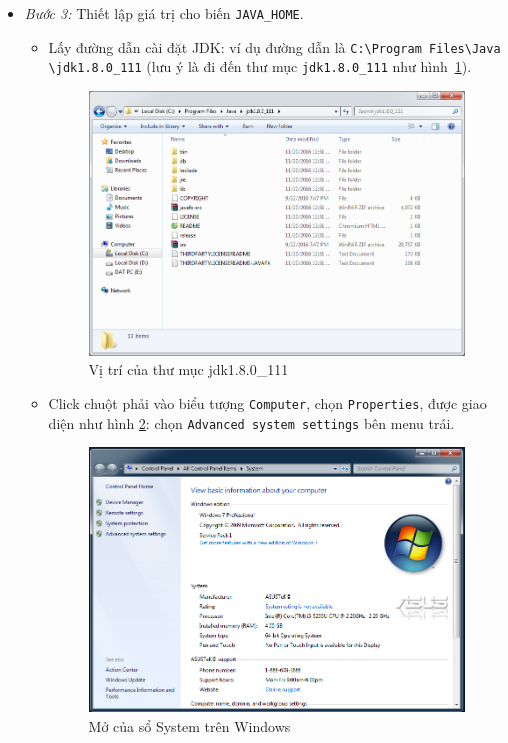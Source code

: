 \documentclass[13pt,a4paper]{extreport}
\begin{document}
\begin{itemize}
\newpage			
		\item \textit{Bước 3:} Thiết lập giá trị cho biến \verb|JAVA_HOME|.
			\begin{itemize}
				\item Lấy đường dẫn cài đặt JDK: ví dụ đường dẫn là \verb|C:\Program Files\Java| \verb|\jdk1.8.0_111| (lưu ý là đi đến thư mục \verb|jdk1.8.0_111| như hình~\ref{Fig:local-jdk}).
					\begin{figure}[!h]
						\begin{center}
							\includegraphics[scale=.5]{local-jdk.png} 
						\end{center}
						\caption{Vị trí của thư mục jdk1.8.0\_111}
						\label{Fig:local-jdk}
					\end{figure}
					
				\item Click chuột phải vào biểu tượng \verb|Computer|, chọn \verb|Properties|, được giao diện như hình \ref{Fig:setup-JDK-JAVA-HOME-1}: chọn \verb|Advanced system settings| bên menu trái.
					\begin{figure}[!h]
						\begin{center}
							\includegraphics[scale=.5]{setup-JDK-JAVA-HOME-1.png}
						\end{center}
						\caption{Mở của sổ System trên Windows}
						\label{Fig:setup-JDK-JAVA-HOME-1}
					\end{figure}
					

\end{itemize}
\end{itemize}
\end{document}
